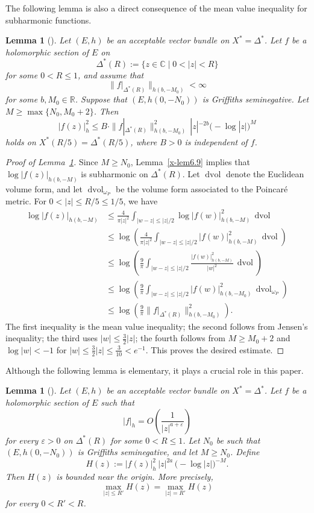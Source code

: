 \documentclass[12pt,twoside]{amsart}
\DeclareMathOperator{\dvol}{dvol}
\newtheorem{lem}[thm]{Lemma}
\theoremstyle{definition}
\begin{document}
The following lemma is also a direct consequence of the mean value inequality 
for subharmonic functions.

\begin{lem}[{\cite[Lemma~21.2.6]{mochizuki4}}]\label{x-lem7.2} 
Let $(E,h)$ be an acceptable vector bundle on $X^* = \Delta^*$.  
Let $f$ be a holomorphic section of $E$ on
\[
\Delta^*(R) := \{ z \in \mathbb{C} \mid 0 < |z| < R \}
\]
for some $0 < R \le 1$, and assume that
\[
\| f|_{\Delta^*(R)} \|_{h(b,-M_0)} < \infty
\]
for some $b, M_0 \in \mathbb{R}$.  
Suppose that $(E,h(0,-N_0))$ is Griffiths seminegative.  
Let $M \ge \max\{N_0, M_0 + 2\}$.  
Then
\[
|f(z)|_h^2 
\le 
B \cdot 
\| f|_{\Delta^*(R)} \|_{h(b,-M_0)}^2 
\, |z|^{-2b} \bigl(-\log |z|\bigr)^{M}
\]
holds on $X^*(R/5) = \Delta^*(R/5)$, where $B>0$ is independent of $f$.
\end{lem}

\begin{proof}[Proof of Lemma~\ref{x-lem7.2}]
Since $M \ge N_0$, Lemma~\ref{x-lem6.9} implies that 
$\log |f(z)|_{h(b,-M)}$ is subharmonic on $\Delta^*(R)$.  
Let $\dvol$ denote the Euclidean volume form, and 
let $\dvol_{\omega_P}$ be the volume form associated to the 
Poincaré metric.  
For $0 < |z| \le R/5 \le 1/5$, we have
\[
\begin{aligned}
\log |f(z)|_{h(b,-M)}
&\le \frac{4}{\pi |z|^2}
\int_{|w-z|\le |z|/2} \log |f(w)|_{h(b,-M)}^2 \, \dvol  
\\
&\le 
\log \left(
\frac{4}{\pi |z|^2}
\int_{|w-z|\le |z|/2} |f(w)|_{h(b,-M)}^2 \, \dvol
\right)
\\
&\le 
\log \left(
\frac{9}{\pi}
\int_{|w-z|\le |z|/2} 
\frac{|f(w)|_{h(b,-M)}^2}{|w|^2}
\, \dvol
\right)
\\
&\le
\log \left(
\frac{9}{\pi}
\int_{|w-z|\le |z|/2}
|f(w)|_{h(b,-M_0)}^2 
\, \dvol_{\omega_P}
\right)
\\
&\le 
\log \left(
\frac{9}{\pi}
\| f|_{\Delta^*(R)} \|_{h(b,-M_0)}^2
\right).
\end{aligned}
\]
The first inequality is the mean value inequality;  
the second follows from Jensen's inequality;  
the third uses $|w|\le \tfrac{3}{2}|z|$;  
the fourth follows from $M \ge M_0 + 2$ and $\log|w| < -1$ for 
$|w|\le \tfrac{3}{2}|z| \le \tfrac{3}{10} < e^{-1}$.  
This proves the desired estimate.
\end{proof}

Although the following lemma is elementary, 
it plays a crucial role in this paper.

\begin{lem}[{\cite[Lemma~21.2.7]{mochizuki4}}]\label{x-lem7.3}
Let $(E,h)$ be an acceptable vector bundle on $X^* = \Delta^*$.  
Let $f$ be a holomorphic section of $E$ such that
\[
|f|_h = O\!\left( \frac{1}{|z|^{a+\varepsilon}} \right)
\]
for every $\varepsilon > 0$ on $\Delta^*(R)$ for some $0 < R \le 1$.  
Let $N_0$ be such that $(E,h(0,-N_0))$ is Griffiths seminegative, 
and let $M \ge N_0$.  
Define
\[
H(z) := |f(z)|_h^2 \, |z|^{2a} \, \bigl(-\log|z|\bigr)^{-M}.
\]
Then $H(z)$ is bounded near the origin.  
More precisely,
\[
\max_{|z|\le R'} H(z)
= 
\max_{|z|=R'} H(z)
\]
for every $0 < R' < R$.
\end{lem}
\end{document}
